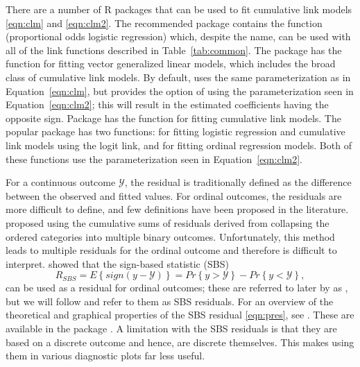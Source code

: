 There are a number of R packages that can be used to fit cumulative link models \eqref{eqn:clm} and \eqref{eqn:clm2}. The recommended package  \citep{pkg-MASS} contains the function  (proportional odds logistic regression) which, despite the name, can be used with all of the link functions described in Table~\ref{tab:common}. The  package \citep{pkg-VGAM} has the  function for fitting vector generalized linear models, which includes the broad class of cumulative link models. By default,  uses the same parameterization as in Equation~\eqref{eqn:clm}, but provides the option of using the parameterization seen in Equation~\eqref{eqn:clm2}; this will result in the estimated coefficients having the opposite sign. Package  \citep{pkg-ordinal} has the  function for fitting cumulative link models. The popular  package \citep{pkg-rms} has two functions:  for fitting logistic regression and cumulative link models using the logit link, and  for fitting ordinal regression models. Both of these functions use the parameterization seen in Equation~\eqref{eqn:clm2}.

For a continuous outcome $\mathcal{Y}$, the residual is traditionally defined as the difference between the observed and fitted values. For ordinal outcomes, the residuals are more difficult to define, and few definitions have been proposed in the literature. \citet{graphical-liu-2009} proposed using the cumulative sums of residuals derived from collapsing the ordered categories into multiple binary outcomes. Unfortunately, this method leads to multiple residuals for the ordinal outcome and therefore is difficult to interpret. \citet{residuals-li-2012} showed that the sign-based statistic (SBS)
\begin{equation}
\label{eqn:pres}
  R_{SBS} = E\left\{sign\left(y - \mathcal{Y}\right)\right\} = Pr\left\{y > \mathcal{Y}\right\} - Pr\left\{y < \mathcal{Y}\right\},
\end{equation}
can be used as a residual for ordinal outcomes; these are referred to later by \citeauthor{residuals-li-2012} as , but we will follow \citet{residuals-liu-2017} and refer to them as SBS residuals. For an overview of the theoretical and graphical properties of the SBS residual \eqref{eqn:pres}, see \citet{residuals-liu-2017}. These are available in the  package \citep{pkg-PResiduals}. A limitation with the SBS residuals is that they are based on a discrete outcome and hence, are discrete themselves. This makes using them in various diagnostic plots far less useful.


